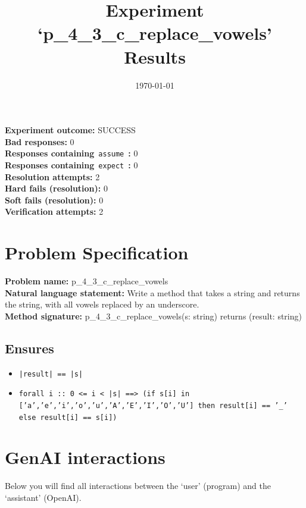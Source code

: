\documentclass{article}
\begin{document}
\title{Experiment `p\_4\_3\_c\_replace\_vowels' Results}
\author{\today}
\date{}
\maketitle
\textbf{Experiment outcome: }SUCCESS
\\\textbf{Bad responses: }0
\\\textbf{Responses containing}~\texttt{assume}~\textbf{: }0
\\\textbf{Responses containing}~\texttt{expect}~\textbf{: }0
\\\textbf{Resolution attempts: }2
\\\textbf{Hard fails (resolution): }0
\\\textbf{Soft fails (resolution): }0
\\\textbf{Verification attempts: }2
\section*{Problem Specification}
\textbf{Problem name: }p\_4\_3\_c\_replace\_vowels
\\\textbf{Natural language statement: }Write a method that takes a string and returns the string, with all vowels replaced by an underscore.
\\\textbf{Method signature: }p\_4\_3\_c\_replace\_vowels(s: string) returns (result: string)
\subsection*{Ensures}
\begin{itemize}
\item \texttt{|result| == |s|}
\item \texttt{forall i :: 0 <= i < |s| ==> (if s[i] in ['a','e','i','o','u','A','E','I','O','U'] then result[i] == '\_' else result[i] == s[i])}
\end{itemize}
\clearpage
\section*{GenAI interactions}
Below you will find all interactions between the `user' (program) and the `assistant' (OpenAI).
\end{document}
